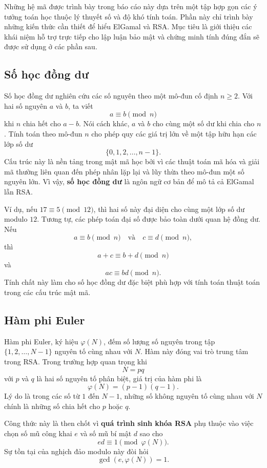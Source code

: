 Những hệ mã được trình bày trong báo cáo này dựa trên một tập hợp gọn các ý tưởng toán học thuộc lý thuyết số và độ khó tính toán. Phần này chỉ trình bày những kiến thức cần thiết để hiểu ElGamal và RSA. Mục tiêu là giới thiệu các khái niệm hỗ trợ trực tiếp cho lập luận bảo mật và chứng minh tính đúng đắn sẽ được sử dụng ở các phần sau.

\subsection{Số học đồng dư}

Số học đồng dư nghiên cứu các số nguyên theo một mô-đun cố định $n \geq 2$. Với hai số nguyên $a$ và $b$, ta viết
\[
a \equiv b \pmod{n}
\]
khi $n$ chia hết cho $a-b$. Nói cách khác, $a$ và $b$ cho cùng một số dư khi chia cho $n$. Tính toán theo mô-đun $n$ cho phép quy các giá trị lớn về một tập hữu hạn các lớp số dư
\[
\{0,1,2,\dots,n-1\}.
\]
Cấu trúc này là nền tảng trong mật mã học bởi vì các thuật toán mã hóa và giải mã thường liên quan đến phép nhân lặp lại và lũy thừa theo mô-đun một số nguyên lớn. Vì vậy, \textbf{số học đồng dư} là ngôn ngữ cơ bản để mô tả cả ElGamal lẫn RSA.

Ví dụ, nếu $17 \equiv 5 \pmod{12}$, thì hai số này đại diện cho cùng một lớp số dư modulo $12$. Tương tự, các phép toán đại số được bảo toàn dưới quan hệ đồng dư. Nếu
\[
a \equiv b \pmod{n}
\quad \text{và} \quad
c \equiv d \pmod{n},
\]
thì
\[
a+c \equiv b+d \pmod{n}
\]
và
\[
ac \equiv bd \pmod{n}.
\]
Tính chất này làm cho số học đồng dư đặc biệt phù hợp với tính toán thuật toán trong các cấu trúc mật mã.

\subsection{Hàm phi Euler}

Hàm phi Euler, ký hiệu $\varphi(N)$, đếm số lượng số nguyên trong tập $\{1,2,\dots,N-1\}$ nguyên tố cùng nhau với $N$. Hàm này đóng vai trò trung tâm trong RSA. Trong trường hợp quan trọng khi
\[
N = pq
\]
với $p$ và $q$ là hai số nguyên tố phân biệt, giá trị của hàm phi là
\[
\varphi(N) = (p-1)(q-1).
\]
Lý do là trong các số từ $1$ đến $N-1$, những số không nguyên tố cùng nhau với $N$ chính là những số chia hết cho $p$ hoặc $q$.

Công thức này là then chốt vì \textbf{quá trình sinh khóa RSA} phụ thuộc vào việc chọn số mũ công khai $e$ và số mũ bí mật $d$ sao cho
\[
ed \equiv 1 \pmod{\varphi(N)}.
\]
Sự tồn tại của nghịch đảo modulo này đòi hỏi
\[
\gcd(e,\varphi(N)) = 1.
\]

